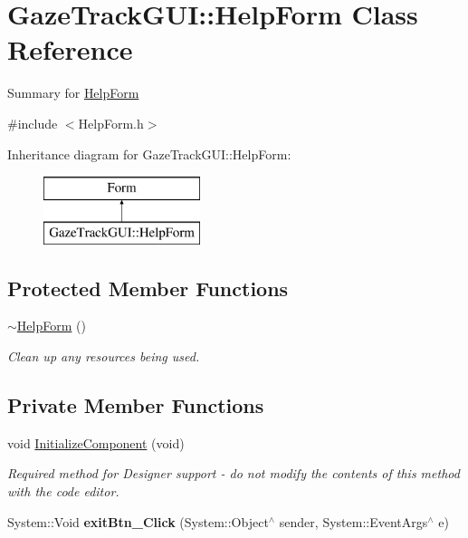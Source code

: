 \hypertarget{class_gaze_track_g_u_i_1_1_help_form}{}\section{Gaze\+Track\+G\+UI\+:\+:Help\+Form Class Reference}
\label{class_gaze_track_g_u_i_1_1_help_form}


Summary for \mbox{\hyperlink{class_gaze_track_g_u_i_1_1_help_form}{Help\+Form}}  




{\ttfamily \#include $<$Help\+Form.\+h$>$}

Inheritance diagram for Gaze\+Track\+G\+UI\+:\+:Help\+Form\+:\begin{figure}[H]
\begin{center}
\leavevmode
\includegraphics[height=2.000000cm]{class_gaze_track_g_u_i_1_1_help_form}
\end{center}
\end{figure}
\subsection*{Protected Member Functions}
\begin{DoxyCompactItemize}
\item 
\mbox{\hyperlink{class_gaze_track_g_u_i_1_1_help_form_a326e89f7265cbbd1b6070a143fa9fba4}{$\sim$\+Help\+Form}} ()
\begin{DoxyCompactList}\small\item\em Clean up any resources being used. \end{DoxyCompactList}\end{DoxyCompactItemize}
\subsection*{Private Member Functions}
\begin{DoxyCompactItemize}
\item 
void \mbox{\hyperlink{class_gaze_track_g_u_i_1_1_help_form_a00fee28d36e80735319d95098c26bbb2}{Initialize\+Component}} (void)
\begin{DoxyCompactList}\small\item\em Required method for Designer support -\/ do not modify the contents of this method with the code editor. \end{DoxyCompactList}\item 
\mbox{\label{class_gaze_track_g_u_i_1_1_help_form_a1f45bc43ca6ea0dde9aea5752fda6f3e}} 
System\+::\+Void {\bfseries exit\+Btn\+\_\+\+Click} (System\+::\+Object$^\wedge$ sender, System\+::\+Event\+Args$^\wedge$ e)
\end{DoxyCompactItemize}
